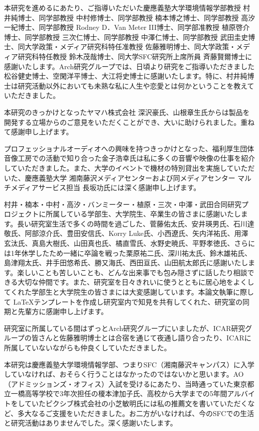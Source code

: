 \begin{acknowledgment}

  本研究を進めるにあたり、ご指導いただいた慶應義塾大学環境情報学部教授 村井純博士、同学部教授 中村修博士、同学部教授 楠本博之博士、同学部教授 高汐一紀博士、同学部教授 Rodney D．Van Meter III博士、同学部准教授 植原啓介博士、同学部教授 三次仁博士、同学部教授 中澤仁博士、同学部教授 武田圭史博士、同大学政策・メディア研究科特任准教授 佐藤雅明博士、同大学政策・メディア研究科特任教授 鈴木茂哉博士、同大学SFC研究所上席所員 斉藤賢爾博士に感謝いたします。Arch研究グループでは、日頃より研究をご指導いただきました松谷健史博士、空閑洋平博士、大江将史博士に感謝いたします。特に、村井純博士は研究活動以外においても未熟な私に人生や恋愛とは何かということを教えていただきました。

  本研究のきっかけとなったヤマハ株式会社 深沢豪氏、山根章生氏からは製品を開発する立場からのご意見をいただくことができ、大いに助けられました。重ねて感謝申し上げます。

  プロフェッショナルオーディオへの興味を持つきっかけとなった、福利厚生団体音像工房での活動で知り合った金子浩幸氏は私に多くの音響や映像の仕事を紹介していただきました。また、大学のイベントで機材の特別貸出を実施していただいた、慶應義塾大学 湘南藤沢メディアセンターおよび同メディアセンター マルチメディアサービス担当 長坂功氏には深く感謝申し上げます。

  村井・楠本・中村・高汐・バンミーター・植原・三次・中澤・武田合同研究プロジェクトに所属している学部生、大学院生、卒業生の皆さまに感謝いたします。長い研究室生活で多くの時間を過ごした、菅藤佑太氏、安井瑛男氏、石川達敬氏、阿部涼介氏、豊田安信氏、Korry Luke氏、小西遼氏、矢内洋祐氏、用澤玄汰氏、真島大樹氏、山田真也氏、橘直雪氏、水野史暁氏、平野孝徳氏、さらには1年休学したため一緒に卒論を戦った栗原祐二氏、深川祐太氏、鈴木雄祐氏、島津翔太氏、井手田悠希氏、勝又海氏、西田亘氏、山田航太郎氏に感謝いたします。楽しいことも苦しいことも、どんな出来事でも包み隠さずに話したり相談できる大切な仲間です。また、研究室を日々きれいに使うとともに居心地をよくしてくれた学部生と大学院生の皆さまには大変感謝しています。本論文執筆に際して \LaTeX テンプレートを作成し研究室内で知見を共有してくれた、研究室の同期と先輩方に感謝申し上げます。

  研究室に所属している間はずっとArch研究グループにいましたが、ICAR研究グループの皆さんと佐藤雅明博士とは合宿を通じて夜通し語り合ったり、ICARに所属していないながらも仲良くしていただきました。

  本研究は慶應義塾大学環境情報学部、つまりSFC（湘南藤沢キャンパス）に入学していなければ、おそらく行うことはなかったのではないかと思います。AO（アドミッションズ・オフィス）入試を受けるにあたり、当時通っていた東京都立一橋高等学校で3年次担任の榎本津加子氏、高校から大学までの5年間アルバイトをしていたピクシブ株式会社の小芝敏明氏には私の推薦文を書いていただくなど、多大なるご支援をいただきました。お二方がいなければ、今のSFCでの生活と研究活動はありませんでした。深く感謝いたします。


\end{acknowledgment}
